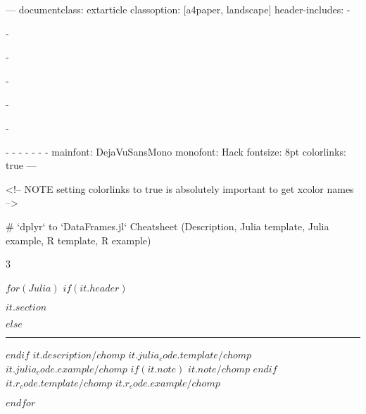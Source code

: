 ---
documentclass: extarticle
classoption: [a4paper, landscape]
header-includes:
  - \usepackage{graphicx}
  - \usepackage[lmargin=1cm,rmargin=1cm,tmargin=1.75cm,bmargin=1.5cm]{geometry}
  - \usepackage{multicol}
  - \usepackage{fvextra}
  - \usepackage{fancyhdr}
  - \usepackage{pgfornament}
  - 
  - \setlength{\columnsep}{30pt}
  - \setlength{\columnseprule}{1pt}
  - \def\columnseprulecolor{\color{Green}}
  - \newcommand{\myRule}[3][black]{\textcolor{#1}{\rule{#2}{#3}}}
  - \let\Begin\begin
  - \let\End\end
mainfont: DejaVuSansMono
monofont: Hack
fontsize: 8pt
colorlinks: true
---

<!-- NOTE setting colorlinks to true is absolutely important to get xcolor names -->

\pagestyle{fancy}
\fancyhf[LH]{}
\fancyhf[RH]{}
\renewcommand{\headrulewidth}{1pt}
\renewcommand{\footrulewidth}{1pt}
\fancyhf[CF]{\thepage}

# `dplyr` to `DataFrames.jl` Cheatsheet \normalsize(Description, Julia template, Julia example, R template, R example)


\Begin{multicols}{3}

$for(Julia)$
$if(it.header)$
\begin{center}  \large \textbf{$it.section$} \normalsize {} \end{center}
$else$
\myRule[Purple]{\linewidth}{2pt}
$endif$ 
\small \textbf{$it.description/chomp$}
\normalsize
$it.julia_code.template/chomp$
\vspace{-5pt}
\small
$it.julia_code.example/chomp$
$if(it.note)$
\footnotesize \emph{$it.note/chomp$}
\small
$endif$
\smallskip
$it.r_code.template/chomp$
\vspace{-10pt}
$it.r_code.example/chomp$
\normalsize

\vspace{-3pt}

$endfor$

\End{multicols}
